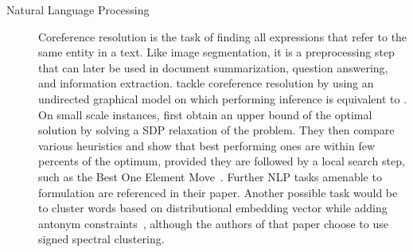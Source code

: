 \begin{description}
   \item[Natural Language Processing] 
      Coreference resolution is the task of finding all expressions that refer to the same entity in
      a text. Like image segmentation, it is a preprocessing step that can later be used in document
      summarization, question answering, and information extraction. \Textcite[Section
      2.3]{graphicalCoreference04} tackle coreference resolution by using an undirected graphical
      model on which performing inference is equivalent to \pcc{}. On small scale instances,
      \textcite{Elsner2009} first obtain an upper bound of the optimal solution by solving a SDP
      relaxation of the problem. They then compare various heuristics and show that best performing
      ones are within few percents of the optimum, provided they are followed by a local search
      step, such as the Best One Element Move~\autocite{Gionis2007}. Further NLP tasks amenable to
      \pcc{} formulation are referenced in their paper. Another possible task would be 
      to cluster words based on distributional embedding vector while adding antonym
      constraints~\autocite{SignedWordRatings}, although the authors of that paper choose to use
      signed spectral clustering.


\end{description}
